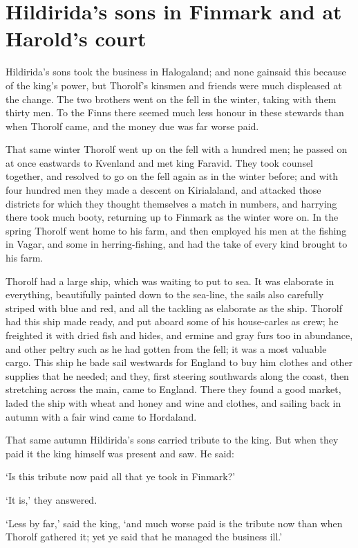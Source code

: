 \chapter{Hildirida's sons in Finmark and at Harold's court}
Hildirida's sons took the business in Halogaland; and none gainsaid this because of the king's power, but Thorolf's kinsmen and friends were much displeased at the change. The two brothers went on the fell in the winter, taking with them thirty men. To the Finns there seemed much less honour in these stewards than when Thorolf came, and the money due was far worse paid.

That same winter Thorolf went up on the fell with a hundred men; he passed on at once eastwards to Kvenland and met king Faravid. They took counsel together, and resolved to go on the fell again as in the winter before; and with four hundred men they made a descent on Kirialaland, and attacked those districts for which they thought themselves a match in numbers, and harrying there took much booty, returning up to Finmark as the winter wore on. In the spring Thorolf went home to his farm, and then employed his men at the fishing in Vagar, and some in herring-fishing, and had the take of every kind brought to his farm.

Thorolf had a large ship, which was waiting to put to sea. It was elaborate in everything, beautifully painted down to the sea-line, the sails also carefully striped with blue and red, and all the tackling as elaborate as the ship. Thorolf had this ship made ready, and put aboard some of his house-carles as crew; he freighted it with dried fish and hides, and ermine and gray furs too in abundance, and other peltry such as he had gotten from the fell; it was a most valuable cargo. This ship he bade sail westwards for England to buy him clothes and other supplies that he needed; and they, first steering southwards along the coast, then stretching across the main, came to England. There they found a good market, laded the ship with wheat and honey and wine and clothes, and sailing back in autumn with a fair wind came to Hordaland.

That same autumn Hildirida's sons carried tribute to the king. But when they paid it the king himself was present and saw. He said:

`Is this tribute now paid all that ye took in Finmark?'

`It is,' they answered.

`Less by far,' said the king, `and much worse paid is the tribute now than when Thorolf gathered it; yet ye said that he managed the business ill.'

